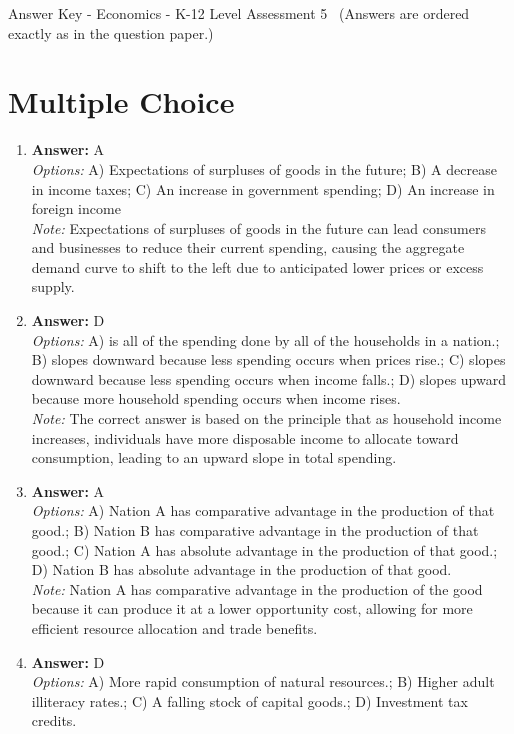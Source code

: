 \documentclass[12pt]{article}
\begin{document}
\begin{center}
Answer Key - Economics - K-12 Level Assessment 5 \
\small (Answers are ordered exactly as in the question paper.)
\end{center}

\section*{Multiple Choice}
\begin{enumerate}[label=\arabic*.]
\item \textbf{Answer:} A
\\ \textit{Options:} A) Expectations of surpluses of goods in the future; B) A decrease in income taxes; C) An increase in government spending; D) An increase in foreign income
\\ \textit{Note:} Expectations of surpluses of goods in the future can lead consumers and businesses to reduce their current spending, causing the aggregate demand curve to shift to the left due to anticipated lower prices or excess supply.
\item \textbf{Answer:} D
\\ \textit{Options:} A) is all of the spending done by all of the households in a nation.; B) slopes downward because less spending occurs when prices rise.; C) slopes downward because less spending occurs when income falls.; D) slopes upward because more household spending occurs when income rises.
\\ \textit{Note:} The correct answer is based on the principle that as household income increases, individuals have more disposable income to allocate toward consumption, leading to an upward slope in total spending.
\item \textbf{Answer:} A
\\ \textit{Options:} A) Nation A has comparative advantage in the production of that good.; B) Nation B has comparative advantage in the production of that good.; C) Nation A has absolute advantage in the production of that good.; D) Nation B has absolute advantage in the production of that good.
\\ \textit{Note:} Nation A has comparative advantage in the production of the good because it can produce it at a lower opportunity cost, allowing for more efficient resource allocation and trade benefits.
\item \textbf{Answer:} D
\\ \textit{Options:} A) More rapid consumption of natural resources.; B) Higher adult illiteracy rates.; C) A falling stock of capital goods.; D) Investment tax credits.

\end{enumerate}
\end{document}
